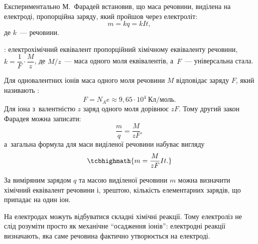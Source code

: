 Експериментально М.~Фарадей встановив, що маса речовини, виділена на електроді,
пропорційна заряду, який пройшов через електроліт:
\begin{equation}\label{eq:FaradayFirst}
	m=kq=kIt,
\end{equation}
де $k$~---  речовини.

: електрохімічний еквівалент пропорційний хімічному
еквіваленту речовини, $k=\dfrac1F\cdot\dfrac{M}{z}$, де $M/z$~--- маса одного моля
еквівалентів, а~$F$~--- універсальна стала.

Для одновалентних іонів маса одного моля речовини $M$ відповідає заряду $F$, який
називають :
\begin{equation*}
	F=N_Ae\approx9{,}65\cdot10^4\ \text{Кл/моль}.
\end{equation*}
Для іона з~валентністю $z$ заряд одного моля дорівнює $zF$. Тому другий закон Фарадея
можна записати:
\begin{equation}\label{eq:FaradaySecond}
	\frac{m}{q}=\frac{M}{zF},
\end{equation}
а~загальна формула для маси виділеної речовини набуває вигляду
\begin{equation}\label{eq:ElectrolysisMass}
	\tcbhighmath{
		m=\frac{M}{zF}It.
	}
\end{equation}

\begin{Attention}
	За виміряним зарядом $q$ та масою виділеної речовини $m$ можна визначити хімічний
	еквівалент речовини і, зрештою, кількість елементарних зарядів, що припадає на один
	іон.
\end{Attention}

На електродах можуть відбуватися складні хімічні реакції. Тому електроліз не слід розуміти
просто як механічне \enquote{осадження іонів}: електродні реакції визначають, яка саме
речовина фактично утворюється на електроді.


